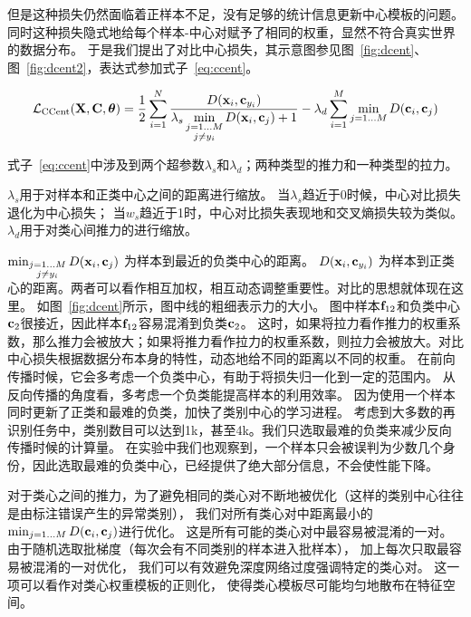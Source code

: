 但是这种损失仍然面临着正样本不足，没有足够的统计信息更新中心模板的问题。
同时这种损失隐式地给每个样本-中心对赋予了相同的权重，显然不符合真实世界的数据分布。
于是我们提出了对比中心损失，其示意图参见图~\ref{fig:dcent}、图~\ref{fig:dcent2}，表达式参加式子~\ref{eq:ccent}。

\begin{equation}
	\mathcal{L}_{\textrm{CCent}} ({\mathbf{X}}, {\mathbf{C}}, {\boldsymbol{\theta}}) = \frac{1}{2}
	\sum_{i=1}^{N}
	\frac{D(
		{\mathbf{x}}_{i}, {\mathbf{c}}_{y_i}
		)}{ 
		\displaystyle \lambda_s
		\min_{\substack{
				j=1...M \\
				j \neq y_i }}
		D(
		{\mathbf{x}}_{i}, {\mathbf{c}}_{j}
		) + 1 }
	-
	\lambda_d \sum_{i=1}^{M}  \min_{j=1...M} D({\mathbf{c}}_i,{\mathbf{c}}_j)
\label{eq:ccent}
\end{equation}

式子~\ref{eq:ccent}中涉及到两个超参数$\lambda_s$和$\lambda_d$；两种类型的推力和一种类型的拉力。

$\lambda_s$用于对样本和正类中心之间的距离进行缩放。
当$\lambda_s$趋近于0时候，中心对比损失退化为中心损失；
当$w_s$趋近于1时，中心对比损失表现地和交叉熵损失较为类似。
$\lambda_d$用于对类心间推力的进行缩放。

$\min_{\substack{
			j=1...M \\
			j \neq y_i }} D(
	{\mathbf{x}}_{i}, {\mathbf{c}}_{j}
	)$
为样本到最近的负类中心的距离。
$D(
	{\mathbf{x}}_{i}, {\mathbf{c}}_{y_i}
	)$
为样本到正类心的距离。两者可以看作相互加权，相互动态调整重要性。对比的思想就体现在这里。
如图~\ref{fig:dcent}所示，图中线的粗细表示力的大小。
图中样本${\mathbf{f}}_{12}$和负类中心${\mathbf{c}}_2$很接近，因此样本${\mathbf{f}}_{12}$容易混淆到负类${\mathbf{c}}_2$。
这时，如果将拉力看作推力的权重系数，那么推力会被放大；如果将推力看作拉力的权重系数，则拉力会被放大。对比中心损失根据数据分布本身的特性，动态地给不同的距离以不同的权重。
在前向传播时候，它会多考虑一个负类中心，有助于将损失归一化到一定的范围内。
从反向传播的角度看，多考虑一个负类能提高样本的利用效率。
因为使用一个样本同时更新了正类和最难的负类，加快了类别中心的学习进程。
考虑到大多数的再识别任务中，类别数目可以达到1k，甚至4k。我们只选取最难的负类来减少反向传播时候的计算量。
在实验中我们也观察到，一个样本只会被误判为少数几个身份，因此选取最难的负类中心，已经提供了绝大部分信息，不会使性能下降。

对于类心之间的推力，为了避免相同的类心对不断地被优化（这样的类别中心往往是由标注错误产生的异常类别），
我们对所有类心对中距离最小的$\min_{j=1...M} D({\mathbf{c}}_i,{\mathbf{c}}_j)$进行优化。
这是所有可能的类心对中最容易被混淆的一对。
由于随机选取批梯度（每次会有不同类别的样本进入批样本），
加上每次只取最容易被混淆的一对优化，
我们可以有效避免深度网络过度强调特定的类心对。
这一项可以看作对类心权重模板的正则化，
使得类心模板尽可能均匀地散布在特征空间。


